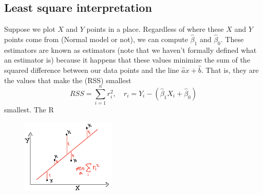 \subsection{Least square interpretation}
 Suppose we plot $X$  and $Y$ points in a place. Regardless of where these $X$ and $Y$ points come from (Normal model or not), we can compute $\hat{\beta}_1$ and $\hat{\beta}_0$. 
These estimators are known as  estimators (note that we haven't formally defined what an estimator is) because  it happens that these values minimize the sum of the squared difference between our data points and the line $\hat{a}x + \hat{b}$. That is, they are the values that make the (RSS) smallest
\begin{equation*}
RSS = \sum_{i=1}^n r_i^2,\quad r_i  = Y_i - (\hat{\beta}_1X_i + \hat{\beta}_0)
\end{equation*}
smallest. The R

%
%
%
%
%
%
%
\begin{figure}[h]
\centering
\includegraphics[width=0.4\textwidth]{./../figures/rss}
\caption{ }\label{rss}
\end{figure}


